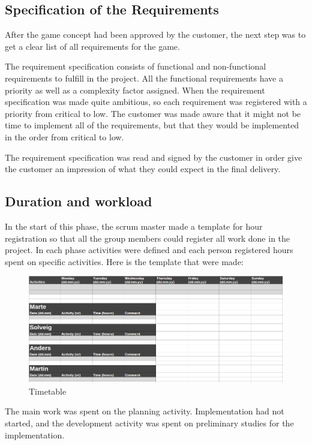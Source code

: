 \subsection{Specification of the Requirements}
	After the game concept had been approved by the customer, the next step was to 
	get a clear list of all requirements for the game. 

	The requirement specification consists of functional and non-functional requirements to
	fulfill in the project. All the functional requirements have a priority as well as a 
	complexity factor assigned. When the requirement specification was made quite 
	ambitious, so each requirement was registered with a priority from critical to low. 
	The customer was made aware that it might not be time to implement all of the requirements, 
	but that they would be implemented in the order from critical to low. 

	The requirement specification was read and signed by the customer in order give the customer 
	an impression of what they could expect in the final delivery.

\subsection{Duration and workload}
	In the start of this phase, the scrum master made a template for hour registration so that all the group members
	could register all work done in the project. In each phase activities were defined and each
	person registered hours spent on specific activities. Here is the template 
	that were made:

	\begin{figure}[H]
		\includegraphics[width=\textwidth]{pictures/timetable.png}
		\caption{Timetable}
	\end{figure}

	The main work was spent on the planning activity. Implementation had not started, and 
	the development activity was spent on preliminary studies for the implementation.

